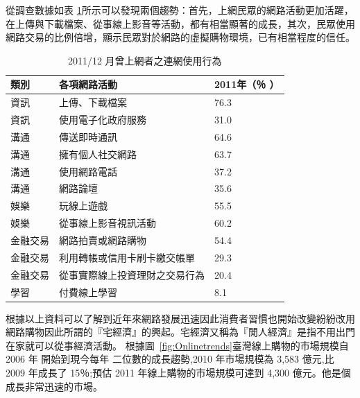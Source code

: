 從調查數據如表 \ref{tab:yuwei_2011122005}所示可以發現兩個趨勢：首先，上網民眾的網路活動更加活躍，在上傳與下載檔案、從事線上影音等活動，都有相當顯著的成長，其次，民眾使用網路交易的比例倍增，顯示民眾對於網路的虛擬購物環境，已有相當程度的信任。\cite{資策會FIND}

\begin{table}[H]
\caption{2011/12 月曾上網者之連網使用行為}
\label{tab:yuwei_2011122005}
\renewcommand{\arraystretch}{1.2} %
\arrayrulewidth=1pt               %
\tabcolsep=24pt                   %
%
\begin{tabular}[t]{lll}  %
\hline
 類別& 各項網路活動 & 2011年（％ ） \\
\hline
資訊        & 上傳、下載檔案 & 76.3\\
資訊        & 使用電子化政府服務 & 31.0 \\
溝通        & 傳送即時通訊  & 64.6 \\
溝通        & 擁有個人社交網路  &63.7\\
溝通        & 使用網路電話  & 37.2 \\
溝通              & 網路論壇  & 35.6 \\
娛樂               & 玩線上遊戲  & 55.5 \\
娛樂               & 從事線上影音視訊活動  & 60.2 \\
金融交易               & 網路拍賣或網路購物  & 54.4 \\
金融交易               &利用轉帳或信用卡刷卡繳交帳單   & 29.3 \\
金融交易              &從事實際線上投資理財之交易行為  & 20.4 \\
學習               & 付費線上學習  & 8.1 \\
\hline
\end{tabular}
\end{table}



根據以上資料可以了解到近年來網路發展迅速因此消費者習慣也開始改變紛紛改用網路購物因此所謂的『宅經濟』的興起。宅經濟又稱為『閒人經濟』是指不用出門在家就可以從事經濟活動。
根據圖~\ref{fig:Onlinetrends}臺灣線上購物的市場規模自 2006 年 開始到現今每年 二位數的成長趨勢,2010 年市場規模為 3,583 億元,比 2009 年成長了 15％;預估 2011 年線上購物的市場規模可達到 4,300 億元\cite{資策會FIND}。他是個成長非常迅速的市場。

